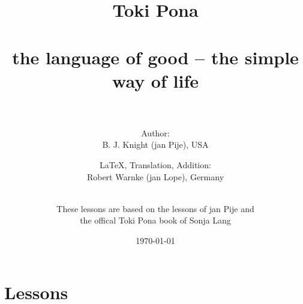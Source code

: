\documentclass[a4paper, 10pt]{book}
\begin{document}
\setlength{\topmargin}{-19mm}
\setlength{\headheight}{5mm}
\setlength{\headsep}{10mm}
\setlength{\textheight}{245mm}
\setlength{\textwidth}{155mm}
\setlength{\oddsidemargin}{5mm}
\setlength{\evensidemargin}{-1mm}
\setlength{\footskip}{20mm}
\setlength{\parindent}{0mm}
\setlength{\parskip}{2.0ex plus 1.0ex minus 0.5ex}
\batchmode
\title{
Toki Pona \\ \\ 
the language of good -- the simple way of life \\ \\
}
\author{
Author: \\ B. J. Knight (jan Pije), USA \cite{www:Pije:01} \\  
\and
\LaTeX, Translation, Addition: \\ Robert Warnke (jan Lope), Germany \cite{www:rowa:01} \\ 
\and
 \\ These lessons are based on the lessons of jan Pije and \\ the offical Toki Pona book of Sonja Lang \cite{www:tokipona.org} \\
}

%
\date
\today
\maketitle
\tableofcontents
%
\chapter{Lessons}

















%


%
\appendix
\end{document}
